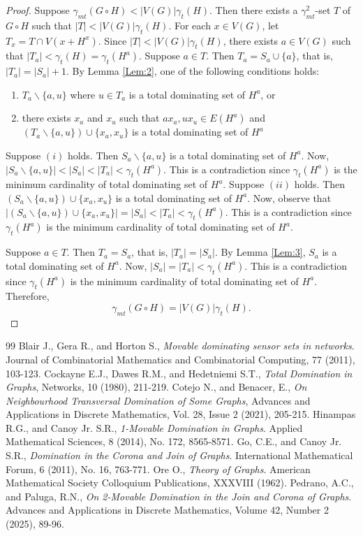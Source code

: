 \documentclass[twoside,12pt]{article}
\begin{document}
\begin{proof}
	Suppose $\gamma_{mt} (G \circ H) < |V(G)| \gamma_{t}(H)$. Then there exists a $\gamma_{mt}^2$-set $T$ of $G \circ H$ such that $|T|< |V(G)| \gamma_{t}(H)$. For each $x \in V(G)$, let $T_x=T \cap V(x + H^x)$. Since $|T|<|V(G)| \gamma_{t}(H) $, there exists $a \in V(G)$ such that $|T_a| < \gamma_t (H) = \gamma_t (H^a)$. Suppose $a \in T$. Then $T_a = S_a \cup \{a\}$, that is, $|T_a| = |S_a| + 1$. By Lemma \ref{Lem:2}, one of the following conditions holds:
	\begin{enumerate}
		\item[(i)] $T_a \backslash \{a,u\}$ where $u \in T_a$ is a total dominating set of $H^a$, or
		\item[(ii)] there exists $x_a$ and $x_u$ such that $ax_a, ux_u \in E(H^a)$ and $(T_a \backslash \{a,u\}) \cup \{x_a, x_u\}$ is a total dominating set of $H^a$
	\end{enumerate}
	
	Suppose $(i)$ holds. Then $S_a \backslash \{a,u\}$ is a total dominating set of $H^a$. Now, $|S_a \backslash \{a,u\}| < |S_a| < |T_a| <\gamma_t (H^a)$. This is a contradiction since $\gamma_t (H^a)$ is the minimum cardinality of total dominating set of $H^a$. Suppose $(ii)$ holds. Then $(S_a \backslash \{a,u\}) \cup \{x_a, x_u\}$ is a total dominating set of $H^a$. Now, observe that $|(S_a \backslash \{a,u\}) \cup \{x_a, x_u\}| = |S_a| < |T_a| < \gamma_t (H^a)$. This is a contradiction since $\gamma_t (H^a)$ is the minimum cardinality of total dominating set of $H^a$.
	
	Suppose $a \in T$. Then $T_a = S_a$, that is, $|T_a| = |S_a|$. By Lemma \ref{Lem:3}, $S_a$ is a total dominating set of $H^a$. Now, $|S_a| = |T_a| < \gamma_t (H^a)$. This is a contradiction since $\gamma_t (H^a)$ is the minimum cardinality of total dominating set of $H^a$. Therefore, $$\gamma_{mt} (G \circ H) = |V(G)| \gamma_t(H).$$
\end{proof}	

\begin{thebibliography}{99}
Blair J., Gera R., and Horton S.,
\emph{Movable dominating sensor sets in networks}. Journal of Combinatorial Mathematics and Combinatorial Computing, 77 (2011), 103-123.
Cockayne E.J., Dawes R.M., and Hedetniemi S.T.,
\emph{Total Domination in Graphs}, Networks, 10 (1980), 211-219.
Cotejo N., and Benacer, E.,
\emph{On Neighbourhood Transversal Domination of Some Graphs}, Advances and Applications in Discrete Mathematics, Vol. 28, Issue 2 (2021), 205-215.
Hinampas R.G., and Canoy Jr. S.R.,
\emph{1-Movable Domination in Graphs}. Applied Mathematical Sciences, 8 (2014), No. 172, 8565-8571.
Go, C.E., and Canoy Jr. S.R.,
\emph{Domination in the Corona and Join of Graphs}. International Mathematical Forum, 6 (2011), No. 16, 763-771.
Ore O.,
\emph{Theory of Graphs}. American Mathematical Society Colloquium Publications, XXXVIII (1962).
Pedrano, A.C., and Paluga, R.N.,
\emph{On 2-Movable Domination in the Join and Corona of Graphs}. Advances and Applications in Discrete Mathematics, Volume 42, Number 2 (2025), 89-96.
\end{thebibliography}
\end{document}
